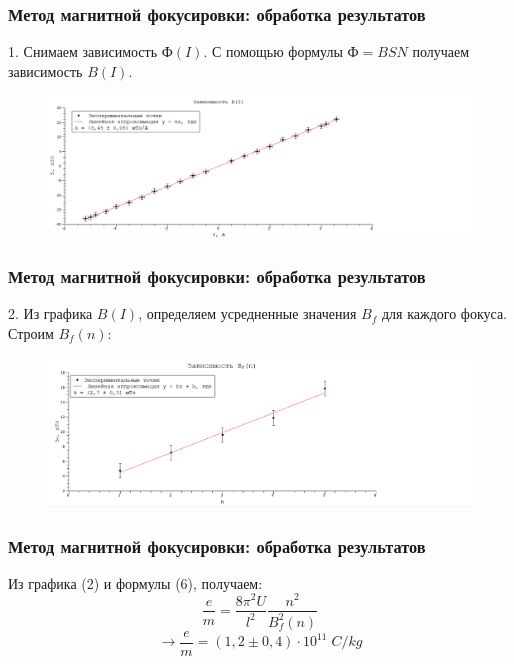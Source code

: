 \documentclass{beamer}
\begin{document}
\begin{frame}
\frametitle{Метод магнитной фокусировки: обработка результатов}
1. Снимаем зависимость $Ф(I)$. С помощью формулы $Ф = BSN$ получаем зависимость $B(I)$.
\begin{figure}
	\includegraphics[width=14.5cm]{g2.PNG}
	\label{ris:ris2}
\end{figure}
\end{frame}
\begin{frame}
\frametitle{Метод магнитной фокусировки: обработка результатов}
2. Из графика $B(I)$, определяем усредненные значения $B_f$ для каждого фокуса. Строим $B_f(n):$
\newline
\begin{left}
\begin{figure}

	\includegraphics[width=17cm]{g1.PNG}
	\label{ris:ris1}
    \end{figure}
\end{left}
\end{frame}


\begin{frame}
\frametitle{Метод магнитной фокусировки: обработка результатов}
Из графика (2) и формулы (6), получаем:
\[\frac{e}{m} = \frac{8 \pi^2 U}{l^2} \frac{n^2}{B_f^2(n)}\]
\[\longrightarrow \frac{e}{m} = (1,2 \pm 0,4) \cdot 10^{11}\; C/kg\] 
\end{frame}
\end{document}

